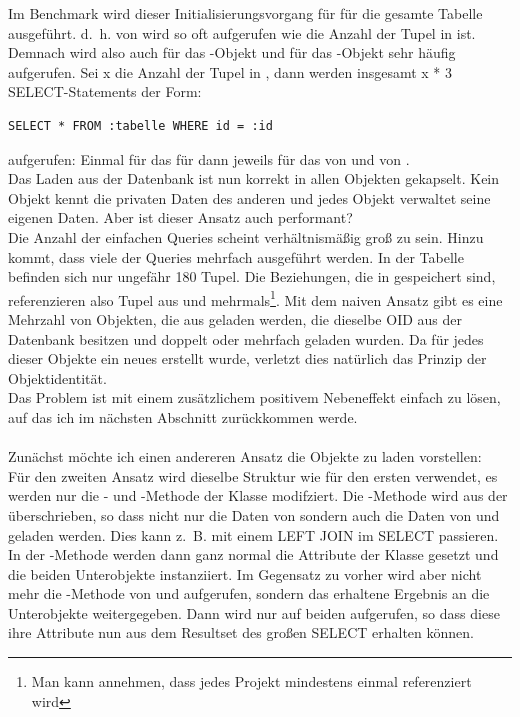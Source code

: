 Im Benchmark wird dieser Initialisierungsvorgang für  für die gesamte Tabelle  ausgeführt. d.~h.  von  wird so oft aufgerufen wie die Anzahl der Tupel in  ist. Demnach wird also auch für das -Objekt und für das -Objekt  sehr häufig aufgerufen. Sei x die Anzahl der Tupel in , dann werden insgesamt x * 3 SELECT-Statements der Form:
\lstset{style=SQL}
\begin{lstlisting}
SELECT * FROM :tabelle WHERE id = :id
\end{lstlisting}
aufgerufen: Einmal für das  für  dann jeweils für das  von  und von .\\
Das Laden aus der Datenbank ist nun korrekt in allen Objekten gekapselt. Kein Objekt kennt die privaten Daten des anderen und jedes Objekt verwaltet seine eigenen Daten. Aber ist dieser Ansatz auch performant?\\
Die Anzahl der einfachen Queries scheint verhältnismäßig groß zu sein. Hinzu kommt, dass viele der Queries mehrfach ausgeführt werden. In der Tabelle  befinden sich nur ungefähr 180 Tupel. Die Beziehungen, die in  gespeichert sind, referenzieren also Tupel aus  und  mehrmals\footnote{Man kann annehmen, dass jedes Projekt mindestens einmal referenziert wird}. Mit dem naiven Ansatz gibt es eine Mehrzahl von Objekten, die aus  geladen werden, die dieselbe OID aus der Datenbank besitzen und doppelt oder mehrfach geladen wurden. Da für jedes dieser Objekte ein neues erstellt wurde, verletzt dies natürlich das Prinzip der Objektidentität.\\
Das Problem ist mit einem zusätzlichem positivem Nebeneffekt einfach zu lösen, auf das ich im nächsten Abschnitt zurückkommen werde. \\
\\
Zunächst möchte ich einen andereren Ansatz die Objekte zu laden vorstellen:\\
Für den zweiten Ansatz wird dieselbe Struktur wie für den ersten verwendet, es werden nur die - und -Methode der Klasse  modifziert. Die -Methode wird aus der  überschrieben, so dass nicht nur die Daten von  sondern auch die Daten von  und  geladen werden. Dies kann z.~B. mit einem LEFT JOIN im SELECT passieren. In der -Methode werden dann ganz normal die Attribute der Klasse gesetzt und die beiden Unterobjekte instanziiert. Im Gegensatz zu vorher wird aber nicht mehr die -Methode von  und  aufgerufen, sondern das erhaltene Ergebnis an die Unterobjekte weitergegeben. Dann wird nur  auf beiden aufgerufen, so dass diese ihre Attribute nun aus dem Resultset des großen SELECT erhalten können.\\
